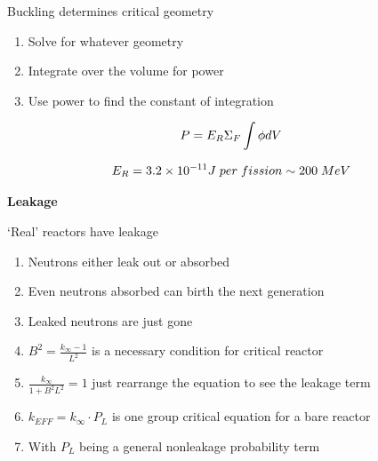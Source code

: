 \documentclass[aspectratio=1610,pdftex,dvipsnames,compress,xcolor={dvipsnames}]{beamer}
\begin{document}
\begin{frame}{Buckling determines critical geometry}
    \begin{enumerate}[series=outerlist,topsep=0pt,itemsep=21pt,leftmargin=*,label=(\arabic*)]
        \item[]Solve for whatever geometry
        \item[]Integrate over the volume for power
        \item[]Use power to find the constant of integration
    \end{enumerate}

    \vspace*{\fill}

    \begin{equation}
        \LARGE
        P = E_R \Sigma_F \int \phi dV
    \end{equation}

    \begin{equation}
        \LARGE
        E_R = 3.2 \times 10^{-11} J \; per \; fission \sim 200 \; MeV
    \end{equation}
\end{frame}


\begin{frame}[plain]{}
    \centering\LARGE\textbf{Leakage}
\end{frame}


\addtocounter{framenumber}{-1} 
\begin{frame}{`Real' reactors have leakage }
    \begin{enumerate}[series=outerlist,topsep=0pt,itemsep=21pt,leftmargin=*,label=(\arabic*)]
        \item[]Neutrons either leak out or absorbed
        \item[]Even neutrons absorbed can birth the next generation
        \item[]Leaked neutrons are just gone
        \item[]$B^2 = \frac{k_\infty - 1}{L^2}$ is a necessary condition for critical reactor
        \item[]$\frac{k_\infty}{1+B^2L^2}=1$ just rearrange the equation to see the leakage term
        \item[]$k_{EFF} = k_{\infty} \cdot P_L$ is one group critical equation for a bare reactor
        \item[]With $P_L$ being a general nonleakage probability term
    \end{enumerate}
\end{frame}
\end{document}

